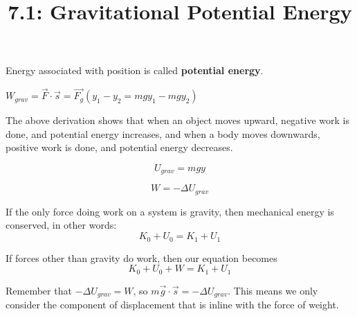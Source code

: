\documentclass{article}
\title{7.1: Gravitational Potential Energy}
\begin{document}
\maketitle
\begin{definition}
Energy associated with position is called \textbf{potential energy}.
\end{definition} 

\begin{proposition}
$W_{grav} = \vec{F}\cdot \vec{s} = \vec{F_g}(y_1 - y_2 = mgy_1 - mgy_2)$

The above derivation shows that when an object moves upward, negative work is done, and potential energy increases, and when a body moves downwards, positive work is done, and potential energy decreases. 

$$U_{grav} = mgy$$

$$W = -\Delta U_{grav}$$
\end{proposition}

\begin{theorem}
If the only force doing work on a system is gravity, then mechanical energy is conserved, in other words: $$K_0 + U_0 = K_1 + U_1$$
\end{theorem}

If forces other than gravity do work, then our equation becomes $$K_0 + U_0 + W = K_1 + U_1$$

\begin{proposition}
Remember that $-\Delta U_{grav} = W$, so $m\vec{g} \cdot \vec{s} = -\Delta U_{grav}$. This means we only consider the component of displacement that is inline with the force of weight. 
\end{proposition}
\end{document}
